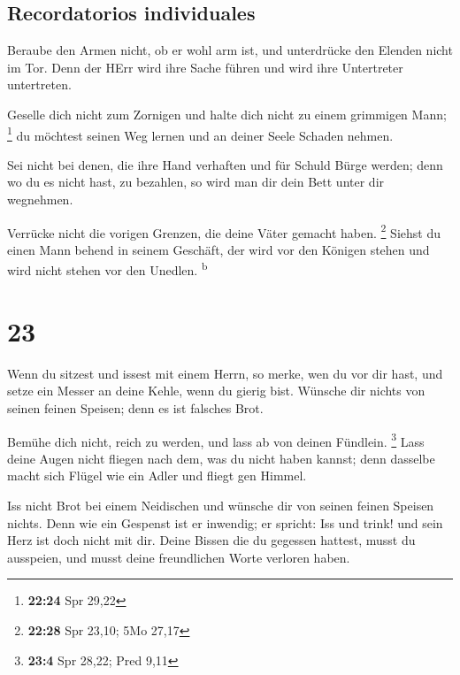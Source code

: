\hypertarget{recordatorios-individuales}{%
\subsection{Recordatorios
individuales}\label{recordatorios-individuales}}

 Beraube den Armen nicht, ob er wohl arm ist, und
unterdrücke den Elenden nicht im Tor.  Denn der HErr wird
ihre Sache führen und wird ihre Untertreter untertreten.

 Geselle dich nicht zum Zornigen und halte dich nicht zu
einem grimmigen Mann; \footnote{\textbf{22:24} Spr 29,22}
 du möchtest seinen Weg lernen und an deiner Seele
Schaden nehmen.

 Sei nicht bei denen, die ihre Hand verhaften und für
Schuld Bürge werden;  denn wo du es nicht hast, zu
bezahlen, so wird man dir dein Bett unter dir wegnehmen.

 Verrücke nicht die vorigen Grenzen, die deine Väter
gemacht haben. \footnote{\textbf{22:28} Spr 23,10; 5Mo 27,17}
 Siehst du einen Mann behend in seinem Geschäft, der wird
vor den Königen stehen und wird nicht stehen vor den Unedlen.
\textsuperscript{b}

\hypertarget{section-22}{%
\section{23}\label{section-22}}

 Wenn du sitzest und issest mit einem Herrn, so merke, wen
du vor dir hast,  und setze ein Messer an deine Kehle,
wenn du gierig bist.  Wünsche dir nichts von seinen feinen
Speisen; denn es ist falsches Brot.

 Bemühe dich nicht, reich zu werden, und lass ab von
deinen Fündlein. \footnote{\textbf{23:4} Spr 28,22; Pred 9,11}
 Lass deine Augen nicht fliegen nach dem, was du nicht
haben kannst; denn dasselbe macht sich Flügel wie ein Adler und fliegt
gen Himmel.

 Iss nicht Brot bei einem Neidischen und wünsche dir von
seinen feinen Speisen nichts.  Denn wie ein Gespenst ist
er inwendig; er spricht: Iss und trink! und sein Herz ist doch nicht mit
dir.  Deine Bissen die du gegessen hattest, musst du
ausspeien, und musst deine freundlichen Worte verloren haben.

